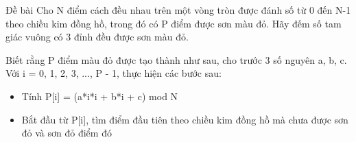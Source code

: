 Đề bài  
Cho N điểm cách đều nhau trên một vòng tròn được đánh số từ 0 đến N-1 theo chiều kim đồng hồ, trong đó có P điểm được sơn màu đỏ. Hãy đếm số tam giác vuông có 3 đỉnh đều được sơn màu đỏ.  

   Biết rằng P điểm màu đỏ được tạo thành như sau, cho trước 3 số nguyên a, b, c. Với i = 0, 1, 2, 3, ..., P - 1, thực hiện các bước sau:  
\begin{itemize}
	\item     Tính P[i] = (a*i*i + b*i + c) mod N   
	\item     Bắt đầu từ P[i], tìm điểm đầu tiên theo chiều kim đồng hồ mà chưa được sơn đỏ và sơn đỏ điểm đó   
\end{itemize}